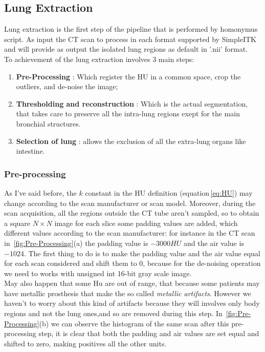 \documentclass{standalone}
\begin{document}
	\subsection{Lung Extraction}
	
	Lung extraction is the first step of the pipeline that is performed by homonymus script. As input the CT scan to process in each format supported by SimpleITK and will provide as output the isolated lung regions as default in '.nii' format.\\
	To achievement of the lung extraction involves 3 main steps: 
	  
	\begin{enumerate}
		\item \textbf{Pre-Processing} :  Which register the HU in a common space, crop the outliers, and de-noise the image;
		
		\item \textbf{Thresholding and reconstruction} : Which is the actual segmentation, that takes care to preserve all the intra-lung regions exept for the main bronchial structures.
		
		\item \textbf{Selection of lung} : allows the exclusion of all the extra-lung organs like intestine.
	\end{enumerate}

	
	\subsubsection{Pre-processing} 
	
	As I've said before, the $k$ constant in the HU definition (equation\,\ref{eq:HU}) may change according to the scan manufacturer or scan model. Moreover, during the scan acquisition, all the regions outside the CT tube aren't sampled, so to obtain a square $N\times N$ image for each slice some padding values are added, which different values according to the scan manufacturer: for instance in the CT scan in \figurename\,\ref{fig:Pre-Processing}(a) the padding value is $-3000 HU$ and the air value is $-1024$. The first thing to do is to make the padding value and the air value equal for each scan considered and shift them to $0$, because for the de-noising operation we need to works with unsigned int 16-bit gray scale image.\\
	May also happen that some Hu are out of range, that because some patients may have metallic prosthesis that make the so called \textit{metallic artifacts}. However we haven't to worry about this kind of artifacts because they will involves only body regions and not the lung ones,and so are removed during this step.
	In \figurename\,\ref{fig:Pre-Processing}(b) we can observe the histogram of the same scan after this pre-processing step, it is clear that both the padding and air values are set equal and shifted to zero, making positives all the other units.
	
\end{document}
